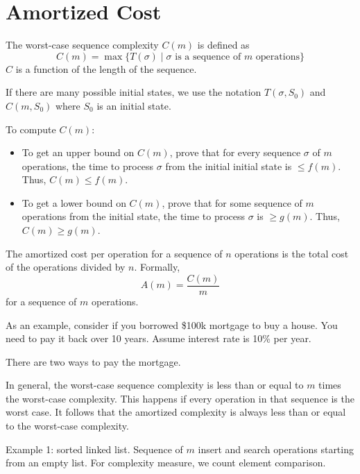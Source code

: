 \section{Amortized Cost}

\vspace{\parskip}

\begin{definition}
    The worst-case sequence complexity $C(m)$ is defined as
    $$
    C(m) = \max \{ T(\sigma) \mid \text{$\sigma$ is a sequence of $m$ operations} \}
    $$
    $C$ is a function of the length of the sequence.
\end{definition}

If there are many possible initial states, we use the notation $T(\sigma, S_0)$ and $C(m,S_0)$ where $S_0$ is an initial state.

To compute $C(m)$:

\begin{itemize}
    \item To get an upper bound on $C(m)$, prove that for every sequence $\sigma$ of $m$ operations, the time to process $\sigma$ from the initial initial state is $\leq f(m)$. Thus, $C(m) \leq f(m)$.
    \item To get a lower bound on $C(m)$, prove that for some sequence of $m$ operations from the initial state, the time to process $\sigma$ is $\geq g(m)$. Thus, $C(m) \geq g(m)$.
\end{itemize}

\begin{definition} 
    The amortized cost per operation for a sequence of $n$ operations is the total cost of the operations divided by $n$. Formally,
    $$
    A(m) = \frac{C(m)}{m}
    $$
    for a sequence of $m$ operations.
\end{definition}

As an example, consider if you borrowed \$100k mortgage to buy a house. You need to pay it back over 10 years. Assume interest rate is 10\% per year.

There are two ways to pay the mortgage.

In general, the worst-case sequence complexity is less than or equal to $m$ times the worst-case complexity. This happens if every operation in that sequence is the worst case. It follows that the amortized complexity is always less than or equal to the worst-case complexity.

Example 1: sorted linked list. Sequence of $m$ insert and search operations starting from an empty list. For complexity measure, we count element comparison.

